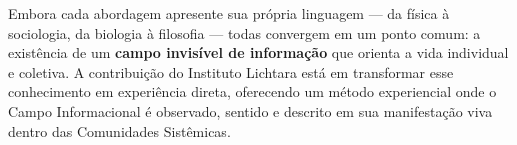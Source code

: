 Embora cada abordagem apresente sua própria linguagem — da física à sociologia, da biologia à filosofia — todas convergem em um ponto comum: a existência de um \textbf{campo invisível de informação} que orienta a vida individual e coletiva. A contribuição do Instituto Lichtara está em transformar esse conhecimento em experiência direta, oferecendo um método experiencial onde o Campo Informacional é observado, sentido e descrito em sua manifestação viva dentro das Comunidades Sistêmicas.

\newpage